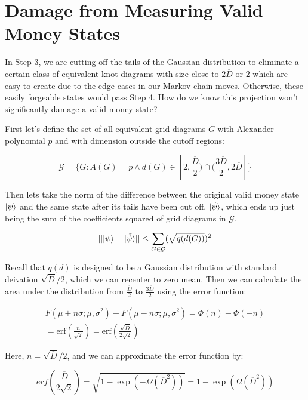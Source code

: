 \section{Damage from Measuring Valid Money States}

In Step 3, we are cutting off the tails of the Gaussian distribution
to eliminate a certain class of equivalent knot diagrams with size close
to $2\overline{D}$ or $2$ which are easy to create due to the edge cases
in our Markov chain moves. Otherwise, these easily forgeable states would
pass Step 4. How do we know this projection won't significantly damage a valid
money state?

First let's define the set of all equivalent
grid diagrams $G$ with Alexander polynomial $p$ and with dimension outside
the cutoff regions:

\begin{displaymath}
\mathcal{G} = \{
G:A(G)=p \land d(G) \in
[2, \frac{\overline{D}}{2})
\cap (\frac{3\overline{D}}{2},2\overline{D}]
\}
\end{displaymath}

Then lets take the norm of the difference between the original valid money state
$|\psi \rangle$ and the same state after its tails have been cut off,
$|\tilde{\psi} \rangle$, which ends up just being the sum of the coefficients
squared
of grid diagrams in $\mathcal{G}$.

\begin{displaymath}
|| |\psi \rangle - |\tilde{\psi} \rangle || \le
\sum_{G \in \mathcal{G}} (\sqrt{q(d(G))})^2
\end{displaymath}

Recall that $q(d)$ is designed to be a Gaussian distribution with
standard deivation $\sqrt{\overline{D}}/2$, which we can recenter to zero mean.
Then we
can calculate the area under the distribution from
$\frac{\overline{D}}{2}$ to $\frac{3\overline{D}}{2}$ using the error function:
\cite{WikipediaNormal}

\begin{multline*}
F(\mu + n\sigma; \mu, \sigma^2) - F(\mu - n\sigma; \mu, \sigma^2) = 
\Phi(n) - \Phi(-n) \\ = \textrm{erf}(\frac{n}{\sqrt{2}}) =
\textrm{erf}(\frac{\sqrt{\overline{D}}}{2\sqrt{2}})
\end{multline*}

Here, $n = \sqrt{\overline{D}}/2$, and we can approximate the
error function by:

\begin{displaymath}
erf(\frac{\overline{D}}{2\sqrt{2}}) =
\sqrt{1 - \exp(-\Omega(\overline{D}^2))} = 1 - \exp(\Omega(\overline{D}^2))
\end{displaymath}
